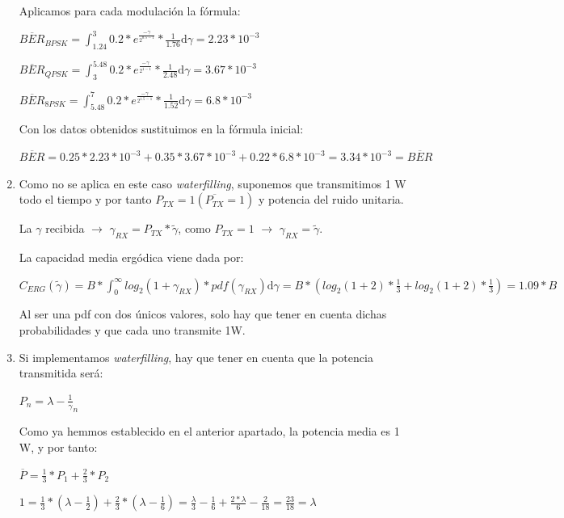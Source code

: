 \documentclass[fleqn,14pt]{article}
\begin{document}
\begin{enumerate}[1.]
    Aplicamos para cada modulación la fórmula:

    $\overline{BER}_{BPSK} = \int_{1.24}^{3}0.2*e^{\frac{-\gamma}{2^{0.5-1}}}*\frac{1}{1.76} \mathrm{d}\gamma = 2.23*10^{-3}$

    $\overline{BER}_{QPSK} = \int_{3}^{5.48}0.2*e^{\frac{-\gamma}{2^{1-1}}}*\frac{1}{2.48} \mathrm{d}\gamma = 3.67*10^{-3}$

    $\overline{BER}_{8PSK} = \int_{5.48}^{7}0.2*e^{\frac{-\gamma}{2^{1.5-1}}}*\frac{1}{1.52} \mathrm{d}\gamma = 6.8*10^{-3}$

    Con los datos obtenidos sustituimos en la fórmula inicial:


    \centering
    $\overline{BER} =0.25 *  2.23*10^{-3} + 0.35 * 3.67*10^{-3} + 0.22 * 6.8*10^{-3} = \boxed{3.34*10^{-3}=\overline{BER}}$

    \raggedright
    \item Como no se aplica en este caso \textit{waterfilling}, suponemos que transmitimos 1 W todo el tiempo y por tanto $P_{TX} = 1 (\overline{P_{TX}} = 1)$ y potencia del ruido unitaria.

    La $\gamma$ recibida $\rightarrow$ $\gamma_{RX} = P_{TX} * \widetilde{\gamma}$, como $P_{TX}=1$ $\rightarrow$ $\gamma_{RX} =\widetilde{\gamma}$.

    La capacidad media ergódica viene dada por:
    \begin{center}
      $C_{ERG}(\widetilde{\gamma}) = B*\int_{0}^{\infty}log_2(1+\gamma_{RX}) * pdf(\gamma_{RX}) \mathrm{d}\gamma= B*(log_2(1+2)*\frac{1}{3}+log_2(1+2)*\frac{1}{3}) = 1.09*B$
    \end{center}

    Al ser una pdf con dos únicos valores, solo hay que tener en cuenta dichas probabilidades y que cada uno transmite 1W.


    \item Si implementamos \textit{waterfilling}, hay que tener en cuenta que la potencia transmitida será:
    \begin{center}
      $P_n = \lambda-\frac{1}{\gamma}_n$
   \end{center}

   Como ya hemmos establecido en el anterior apartado, la potencia media es 1 W, y por tanto:
   \begin{center}
     $\overline{P} = \frac{1}{3}*P_1+\frac{2}{3}*P_2$

     $1 = \frac{1}{3}*(\lambda-\frac{1}{2}) +  \frac{2}{3}*(\lambda-\frac{1}{6}) = \frac{\lambda}{3} - \frac{1}{6} +  \frac{2*\lambda}{6} - \frac{2}{18} = \boxed{\frac{23}{18}= \lambda}$
   \end{center}


\end{enumerate}
\end{document}
